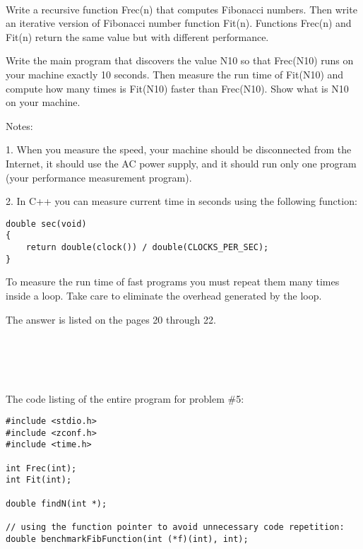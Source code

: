 \documentclass{article}
\begin{document}
	\rmfamily\
	
		Write a recursive function Frec(n) that computes Fibonacci numbers. Then write an iterative version of Fibonacci number function Fit(n). Functions Frec(n) and Fit(n) return the same value but with different performance.
		\newline
		
		Write the main program that discovers the value N10 so that Frec(N10) runs on your machine exactly 10 seconds. Then measure the run time of Fit(N10) and compute how many times is Fit(N10) faster than Frec(N10). Show what is N10 on your machine.
		\newline
		
		\noindent Notes:
		
		1. When you measure the speed, your machine should be disconnected from the Internet, it should use the AC power supply, and it should run only one program (your performance measurement program).
		
		2. In C++ you can measure current time in seconds using the following function:
		
		\begin{verbatim}
double sec(void)
{
    return double(clock()) / double(CLOCKS_PER_SEC);
}
		\end{verbatim}
		
		To measure the run time of fast programs you must repeat them many times inside a loop. Take care to eliminate the overhead generated by the loop.
		\newline
		
		The answer is listed on the pages 20 through 22.

\paragraph{}\
\paragraph{}\



		\noindent The code listing of the entire program for problem \#5: 
		\begin{verbatim}
#include <stdio.h>
#include <zconf.h>
#include <time.h>

int Frec(int);
int Fit(int);

double findN(int *);

// using the function pointer to avoid unnecessary code repetition:
double benchmarkFibFunction(int (*f)(int), int);

		\end{verbatim}
		
\end{document}
